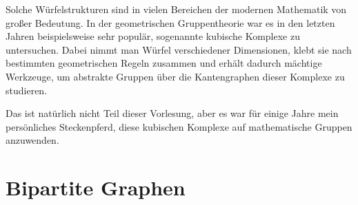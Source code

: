 \begin{math-stroke}
\begin{center}
\end{center}
\end{math-stroke}



\begin{spoken-clean}[00:54:38 - 00:56:52]
Solche Würfelstrukturen sind in vielen Bereichen der modernen Mathematik von großer Bedeutung. In der geometrischen Gruppentheorie war es in den letzten Jahren beispielsweise sehr populär, sogenannte kubische Komplexe zu untersuchen. Dabei nimmt man Würfel verschiedener Dimensionen, klebt sie nach bestimmten geometrischen Regeln zusammen und erhält dadurch mächtige Werkzeuge, um abstrakte Gruppen über die Kantengraphen dieser Komplexe zu studieren.

Das ist natürlich nicht Teil dieser Vorlesung, aber es war für einige Jahre mein persönliches Steckenpferd, diese kubischen Komplexe auf mathematische Gruppen anzuwenden.
\end{spoken-clean}

\section{Bipartite Graphen}

